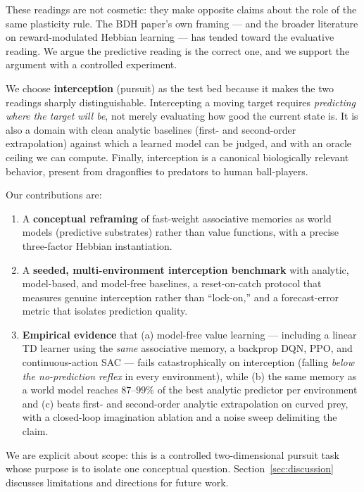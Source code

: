 \documentclass[11pt]{article}
\begin{document}
These readings are not cosmetic: they make opposite claims about the role of the same
plasticity rule. The BDH paper's own framing --- and the broader literature on reward-modulated
Hebbian learning \cite{fremaux2015} --- has tended toward the evaluative reading. We argue the
predictive reading is the correct one, and we support the argument with a controlled
experiment.

We choose \textbf{interception} (pursuit) as the test bed because it makes the two readings
sharply distinguishable. Intercepting a moving target requires \emph{predicting where the
target will be}, not merely evaluating how good the current state is. It is also a domain with
clean analytic baselines (first- and second-order extrapolation) against which a learned model
can be judged, and with an oracle ceiling we can compute. Finally, interception is a canonical
biologically relevant behavior, present from dragonflies to predators to human ball-players.

Our contributions are:
\begin{enumerate}
\item A \textbf{conceptual reframing} of fast-weight associative memories as world models
  (predictive substrates) rather than value functions, with a precise three-factor Hebbian
  instantiation.
\item A \textbf{seeded, multi-environment interception benchmark} with analytic, model-based,
  and model-free baselines, a reset-on-catch protocol that measures genuine interception
  rather than ``lock-on,'' and a forecast-error metric that isolates prediction quality.
\item \textbf{Empirical evidence} that (a) model-free value learning --- including a linear TD
  learner using the \emph{same} associative memory, a backprop DQN, PPO, and continuous-action
  SAC --- fails catastrophically on interception (falling \emph{below the no-prediction reflex}
  in every environment), while (b) the same memory as a world model reaches $87$--$99\%$ of the
  best analytic predictor per environment and (c) beats first- and second-order analytic
  extrapolation on curved prey, with a closed-loop imagination ablation and a noise sweep
  delimiting the claim.
\end{enumerate}

We are explicit about scope: this is a controlled two-dimensional pursuit task whose purpose
is to isolate one conceptual question. Section~\ref{sec:discussion} discusses limitations and
directions for future work.
\end{document}
